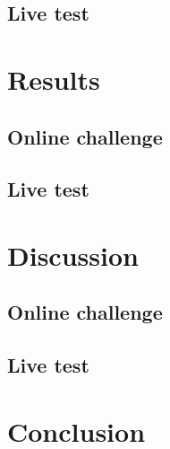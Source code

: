 \documentclass{article}
\begin{document}
\subsection{Live test}



\section{Results}

\subsection{Online challenge}

\subsection{Live test}



\section{Discussion}

\subsection{Online challenge}

\subsection{Live test}

\section{Conclusion}


\end{document}

